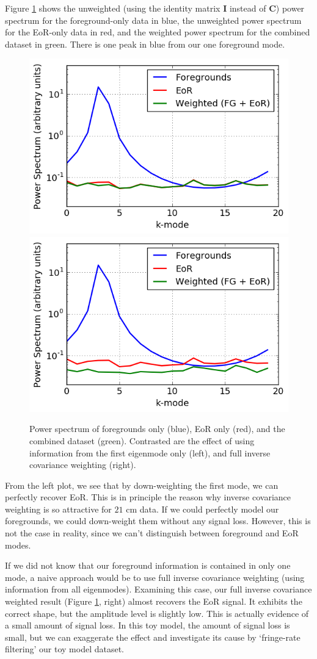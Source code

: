 \documentclass[preprint2,numberedappendix,tighten,twocolappendix]{aastex6}  %
\begin{document}
Figure \ref{fig:toy_sigloss3} shows the unweighted (using the identity matrix $\textbf{I}$ instead of $\textbf{C}$) power spectrum for the foreground-only data in blue, the unweighted power spectrum for the EoR-only data in red, and the weighted power spectrum for the combined dataset in green. There is one peak in blue from our one foreground mode. 

\begin{figure}
	\centering
	\includegraphics[height=0.3\textwidth]{plots/toy_sigloss4.png}
	\includegraphics[height=0.3\textwidth]{plots/toy_sigloss3.png}
	\caption{Power spectrum of foregrounds only (blue), EoR only (red), and the combined dataset (green). Contrasted are the effect of using information from the first eigenmode only (left), and full inverse covariance weighting (right).}
	\label{fig:toy_sigloss3}
\end{figure}

From the left plot, we see that by down-weighting the first mode, we can perfectly recover EoR. This is in principle the reason why inverse covariance weighting is so attractive for $21$ cm data. If we could perfectly model our foregrounds, we could down-weight them without any signal loss. However, this is not the case in reality, since we can't distinguish between foreground and EoR modes.

If we did not know that our foreground information is contained in only one mode, a naive approach would be to use full inverse covariance weighting (using information from all eigenmodes). Examining this case, our full inverse covariance weighted result (Figure \ref{fig:toy_sigloss3}, right) almost recovers the EoR signal. It exhibits the correct shape, but the amplitude level is slightly low. This is actually evidence of a small amount of signal loss. In this toy model, the amount of signal loss is small, but we can exaggerate the effect and investigate its cause by `fringe-rate filtering' our toy model dataset.
\end{document}
